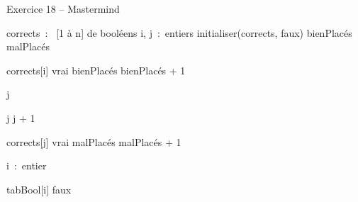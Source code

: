 \begin{Emphase}{Exercice 18 -- Mastermind}

\begin{pseudoN}


    \Decl corrects~:~ [1 à n] de booléens
    \Decl i, j~:~entiers
    \Let initialiser(corrects, faux)
    \Let bienPlacés 
    \Let malPlacés 



            \Let corrects[i] \Gets vrai
            \Let bienPlacés \Gets bienPlacés + 1

        \Else

            \Let j 


                \Let j \Gets j + 1

            \EndWhile


                \Let corrects[j] \Gets vrai
                \Let malPlacés \Gets malPlacés + 1

            \EndIf


        \EndIf

    \EndFor

\EndModule

    \Empty


    \Decl i~:~entier


        \Let tabBool[i] \Gets faux

    \EndFor

\EndModule

\end{pseudoN}

\end{Emphase}


